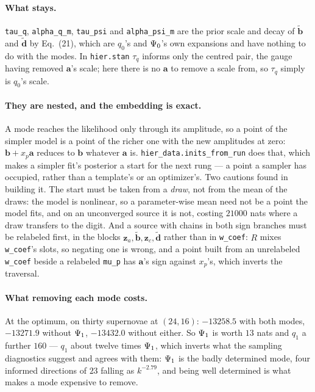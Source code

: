 \documentclass[11pt]{article}
\newcommand{\file}[1]{\texttt{#1}}
\newcommand{\code}[1]{\texttt{#1}}
\begin{document}
\paragraph{What stays.} \code{tau\_q}, \code{alpha\_q\_m}, \code{tau\_psi} and
\code{alpha\_psi\_m} are the prior scale and decay of $\tilde{\mathbf{b}}$ and
$\tilde{\mathbf{d}}$ by Eq.~(21), which are $q_{0}$'s and $\Psi_{0}$'s own expansions and
have nothing to do with the modes. In \file{hier.stan} $\tau_{q}$ informs only the centred
pair, the gauge having removed $\mathbf{a}$'s scale; here there is no $\mathbf{a}$ to
remove a scale from, so $\tau_{q}$ simply is $q_{0}$'s scale.

\paragraph{They are nested, and the embedding is exact.} A mode reaches the likelihood only
through its amplitude, so a point of the simpler model is a point of the richer one with the
new amplitudes at zero: $\mathbf{b} + x_p\mathbf{a}$ reduces to $\mathbf{b}$ whatever
$\mathbf{a}$ is. \code{hier\_data.inits\_from\_run} does that, which makes a simpler fit's
posterior a start for the next rung --- a point a sampler has occupied, rather than a
template's or an optimizer's. Two cautions found in building it. The start must be taken
from a \emph{draw}, not from the mean of the draws: the model is nonlinear, so a
parameter-wise mean need not be a point the model fits, and on an unconverged source it is
not, costing $21000$ nats where a draw transfers to the digit. And a source with chains in
both sign branches must be relabeled first, in the blocks
$\mathbf{z}_{a}, \tilde{\mathbf{b}}, \mathbf{z}_{c}, \tilde{\mathbf{d}}$ rather than in
\code{w\_coef}: $R$ mixes \code{w\_coef}'s slots, so negating one is wrong, and a point
built from an unrelabeled \code{w\_coef} beside a relabeled \code{mu\_p} has
$\mathbf{a}$'s sign against $x_p$'s, which inverts the traversal.

\paragraph{What removing each mode costs.} At the optimum, on thirty supernovae at
$(24, 16)$: $-13258.5$ with both modes, $-13271.9$ without $\Psi_{1}$, $-13432.0$ without
either. So $\Psi_{1}$ is worth $13$ nats and $q_{1}$ a further $160$ --- $q_{1}$ about twelve
times $\Psi_{1}$, which inverts what the sampling diagnostics suggest and agrees with them:
$\Psi_{1}$ is the badly determined mode, four informed directions of $23$ falling as
$k^{-2.79}$, and being well determined is what makes a mode expensive to remove.
\end{document}
